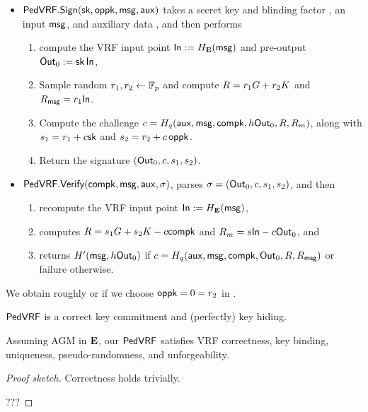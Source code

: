 \begin{itemize}
\item ${\mathsf{PedVRF}}.{\mathsf{Sign}}(\mathsf{sk},\mathsf{oppk},\mathsf{msg},\mathsf{aux})$ takes a secret key \sk and blinding factor \openpk, an input $\mathsf{msg}$, and auxiliary data \aux, and then performs
\begin{enumerate}
    \item compute the VRF input point ${\mathsf{In}} := H_{{\mathbf{E}}}(\mathsf{msg})$ and pre-output ${\mathsf{Out}}_0 := \mathsf{sk} \, {\mathsf{In}}$,
    \item Sample random $r_1,r_2 \leftarrow \mathbb{F}_p$ and compute $R = r_1 G + r_2 K$ and $R_\mathsf{msg} = r_1 {\mathsf{In}}$.
    \item Compute the challenge $c = H_q(\mathsf{aux},\mathsf{msg},\mathsf{compk},h {\mathsf{Out}}_0,R,R_m)$,
     along with $s_1 = r_1 + c \mathsf{sk}$ and $s_2 = r_2 + c \, \mathsf{oppk}$.
    \item Return the signature $({\mathsf{Out}}_0,c,s_1,s_2)$.
\end{enumerate}
\item ${\mathsf{PedVRF}}.{\mathsf{Verify}}(\mathsf{compk},\mathsf{msg},\mathsf{aux},\sigma)$, parses $\sigma = ({\mathsf{Out}}_0,c,s_1,s_2)$, and then 
\begin{enumerate}
    \item recompute the VRF input point ${\mathsf{In}} := H_{{\mathbf{E}}}(\mathsf{msg})$,
    \item computes $R = s_1 G + s_2 K - c \mathsf{compk}$ and $R_m = s {\mathsf{In}} - c {\mathsf{Out}}_0$, and
    \item returns $H'(\mathsf{msg}, h {\mathsf{Out}}_0)$ if $c = H_q(\mathsf{aux},\mathsf{msg},\mathsf{compk},{\mathsf{Out}}_0,R,R_\mathsf{msg})$ or failure otherwise.
\end{enumerate}
\end{itemize}

We obtain roughly \cite{nsec5} or \cite{VXEd25519}
if we choose $\mathsf{oppk} = 0 = r_2$ in \Sign.


\begin{lemma}\label{prop:pedersen_vrf_hiding}
${\mathsf{PedVRF}}$ is a correct key commitment and (perfectly) key hiding.
\end{lemma}


\begin{proposition}\label{prop:pedersen_vrf}
Assuming AGM in ${\mathbf{E}}$, %
our ${\mathsf{PedVRF}}$ satisfies VRF correctness, key binding, uniqueness,
pseudo-randomness, and unforgeability. %
\end{proposition}



\begin{proof}[Proof sketch]
Correctness holds trivially.

???
\end{proof}



